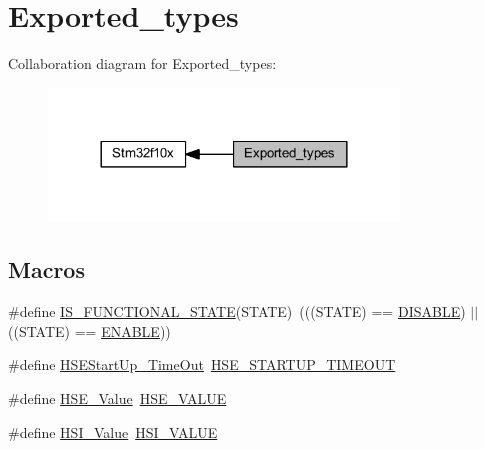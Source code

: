 \hypertarget{group___exported__types}{}\section{Exported\+\_\+types}
\label{group___exported__types}
Collaboration diagram for Exported\+\_\+types\+:
\nopagebreak
\begin{figure}[H]
\begin{center}
\leavevmode
\includegraphics[width=264pt]{group___exported__types}
\end{center}
\end{figure}
\subsection*{Macros}
\begin{DoxyCompactItemize}
\item 
\#define \hyperlink{group___exported__types_gaffaf7c3f537d7a3370b1bbdda67a2bf6}{I\+S\+\_\+\+F\+U\+N\+C\+T\+I\+O\+N\+A\+L\+\_\+\+S\+T\+A\+TE}(S\+T\+A\+TE)~(((S\+T\+A\+TE) == \hyperlink{group___exported__types_ggac9a7e9a35d2513ec15c3b537aaa4fba1ad3a9df141be0ccf10389b640f492b26d}{D\+I\+S\+A\+B\+LE}) $\vert$$\vert$ ((S\+T\+A\+TE) == \hyperlink{group___exported__types_ggac9a7e9a35d2513ec15c3b537aaa4fba1a7d46875fa3ebd2c34d2756950eda83bf}{E\+N\+A\+B\+LE}))
\item 
\#define \hyperlink{group___exported__types_ga7e69dacd5c3b950b5b1786d7336b30d3}{H\+S\+E\+Start\+Up\+\_\+\+Time\+Out}~\hyperlink{group___library__configuration__section_ga68ecbc9b0a1a40a1ec9d18d5e9747c4f}{H\+S\+E\+\_\+\+S\+T\+A\+R\+T\+U\+P\+\_\+\+T\+I\+M\+E\+O\+UT}
\item 
\#define \hyperlink{group___exported__types_gab12a1abe6dd0001e7a0487a8b175b28c}{H\+S\+E\+\_\+\+Value}~\hyperlink{group___library__configuration__section_gaeafcff4f57440c60e64812dddd13e7cb}{H\+S\+E\+\_\+\+V\+A\+L\+UE}
\item 
\#define \hyperlink{group___exported__types_ga5718ca1fe0825cdbebb466886cfb5016}{H\+S\+I\+\_\+\+Value}~\hyperlink{group___library__configuration__section_gaaa8c76e274d0f6dd2cefb5d0b17fbc37}{H\+S\+I\+\_\+\+V\+A\+L\+UE}
\end{DoxyCompactItemize}

